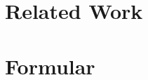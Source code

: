 \documentclass[]{report}
\title{}
\author{Jingyuan Sha}
\begin{document}
\maketitle

\begin{abstract}
\end{abstract}

\newpage
\chapter{Related Work}



\newpage
\chapter{Formular}



\medskip



\end{document}
